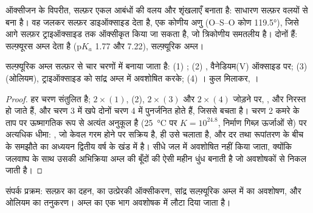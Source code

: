 ऑक्सीजन के विपरीत, सल्फ़र एकल  आबंधों की वलय और शृंखलाएँ बनाता है:
साधारण सल्फ़र  वलयों से बना है। वह जलकर सल्फ़र डाइऑक्साइड देता है, एक
कोणीय अणु (O--S--O कोण \ang{119.5}), जिसे आगे
सल्फ़र ट्राइऑक्साइड तक ऑक्सीकृत किया जा सकता है, जो त्रिकोणीय समतलीय है। दोनों  हैं: 
सल्फ़्यूरस अम्ल देता है ($\mathrm{p}K_a$ 1.77 और 7.22),  सल्फ़्यूरिक
अम्ल।

\begin{proposition}[संपर्क प्रक्रम के चरण]\label{prop:b1:p-block-16-18:contact-steps}
सल्फ़्यूरिक अम्ल सल्फ़र से चार चरणों में बनाया जाता है:
(1) ; (2) , वैनेडियम(V)
ऑक्साइड  पर; (3)  (ओलियम), ट्राइऑक्साइड को
सांद्र अम्ल में अवशोषित करके; (4) । कुल मिलाकर,
।
\end{proposition}

\begin{proof}
हर चरण संतुलित है; $2\times(1)$, (2), $2\times(3)$ और
$2\times(4)$ जोड़ने पर, ,  और  निरस्त हो जाते हैं, और चरण 3 में खपे दोनों
 चरण 4 में पुनर्जनित होते हैं, जिससे
 बचता है। चरण 2 कमरे के ताप पर ऊष्मागतिक रूप से अत्यंत
अनुकूल है (\qty{25}{\celsius} पर $K = 10^{24.8}$, निर्माण
गिब्ज़ ऊर्जाओं से) पर अत्यधिक धीमा: , जो केवल गरम होने पर
सक्रिय है, ही उसे चलाता है, और दर तथा रूपांतरण के बीच के समझौते का
अध्ययन द्वितीय वर्ष के खंड में है।  सीधे जल में
अवशोषित नहीं किया जाता, क्योंकि जलवाष्प के साथ उसकी अभिक्रिया अम्ल की बूँदों की
ऐसी महीन धुंध बनाती है जो अवशोषकों से निकल जाती है।
\end{proof}

\begin{omfigure}

{\small संपर्क प्रक्रम: सल्फ़र का दहन,  का उत्प्रेरकी
ऑक्सीकरण, सांद्र सल्फ़्यूरिक अम्ल में  का अवशोषण, और
ओलियम का तनुकरण। अम्ल का एक भाग अवशोषक में लौटा दिया जाता है।}
\end{omfigure}

